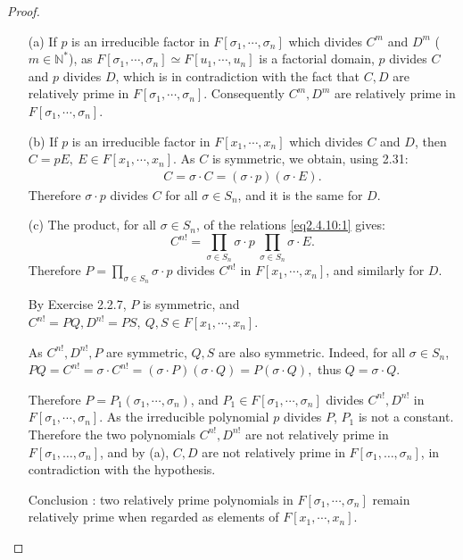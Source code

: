 \documentclass[11pt,a4paper]{article}
\begin{document}
\begin{proof}
\begin{enumerate}
\item[(a)]
If $p$ is an irreducible factor in $F[\sigma_1,\cdots,\sigma_n]$ which divides $C^m$ and $D^m$ ($m\in \mathbb{N}^*$), as $F[\sigma_1,\cdots,\sigma_n] \simeq F[u_1,\cdots,u_n]$ is a factorial domain, $p$ divides $C$ and $p$ divides $D$, which is in contradiction with the fact that $C,D$ are relatively prime in $F[\sigma_1,\cdots,\sigma_n]$. Consequently $C^m,D^m$ are relatively prime in $F[\sigma_1,\cdots,\sigma_n]$.


\item[(b)]
If $p$ is an irreducible factor in $F[x_1,\cdots,x_n]$ which divides $C$ and $D$, then $C = p E,\ E \in F[x_1,\cdots,x_n]$.
As $C$ is symmetric, we obtain, using 2.31:
\begin{align}
C = \sigma\cdot C = (\sigma\cdot p) (\sigma\cdot E).\label{eq2.4.10:1}
\end{align}
Therefore $\sigma \cdot p$ divides $C$ for all $\sigma \in S_n$, and it is the same for $D$.


\item[(c)] The product, for all $\sigma \in S_n$, of the relations \eqref{eq2.4.10:1} gives:
$$C^{n!} =  \prod_{\sigma \in S_n} \sigma \cdot p \  \prod_{\sigma \in S_n} \sigma \cdot  E.$$
Therefore $P= \prod\limits_{\sigma \in S_n} \sigma \cdot  p$ divides  $C^{n!} $ in $F[x_1,\cdots,x_n]$, and similarly for $D$.


By Exercise 2.2.7, $P$ is symmetric, and $C^{n!} = P Q, D^{n!} = P S,\ Q,S \in F[x_1,\cdots,x_n]$.

As $C^{n!},D^{n!},P$ are symmetric, $Q,S$ are also symmetric. Indeed, for all $\sigma \in S_n$, 
$P Q = C^{n!} = \sigma \cdot C^{n!} = (\sigma \cdot P)( \sigma \cdot Q )= P (\sigma \cdot Q),$ thus $Q = \sigma\cdot Q$.

Therefore $P=P_1(\sigma_1,\cdots,\sigma_n)$, and $P_1 \in F[\sigma_1,\cdots,\sigma_n]$ divides $C^{n!},D^{n!}$ in $F[\sigma_1,\cdots,\sigma_n]$. As the irreducible polynomial  $p$ divides $P$, $P_1$ is not a constant. Therefore the two polynomials  $C^{n!},D^{n!}$ are not relatively prime in $F[\sigma_1,\ldots,\sigma_n]$, and by (a), $C,D$ are not relatively prime in $F[\sigma_1,\ldots,\sigma_n]$, in contradiction with the hypothesis.

Conclusion : two relatively prime polynomials in  $F[\sigma_1,\cdots,\sigma_n]$ remain relatively prime when regarded as elements of $F[x_1,\cdots,x_n]$.
\end{enumerate}
\end{proof}
\end{document}
